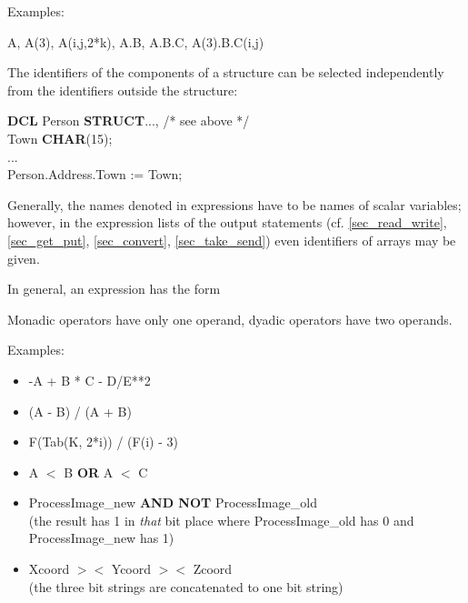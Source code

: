


Examples:

A, A(3), A(i,j,2*k), A.B, A.B.C, A(3).B.C(i,j)

The identifiers of the components of a structure can be selected
independently from the identifiers outside the structure:

{\bf DCL} Person {\bf STRUCT}..., /* see above */ \\
\x Town {\bf CHAR}(15);\\
\x ...\\
Person.Address.Town := Town;

Generally, the names denoted in expressions have to be names of scalar
variables; however, in the expression lists of the output statements
(cf. \ref{sec_read_write}, \ref{sec_get_put}, \ref{sec_convert}, 
\ref{sec_take_send}) even identifiers of arrays may be given.

In general, an expression has the form



Monadic operators have only one operand, dyadic operators have two
operands.







Examples:

\begin{itemize}
\item -A + B * C - D/E**2
\item (A - B) / (A + B)
\item F(Tab(K, 2*i)) / (F(i) - 3)
\item A $<$ B {\bf OR} A $<$ C
\item ProcessImage\_new {\bf AND NOT} ProcessImage\_old\\
      (the result has 1 in {\it that} bit place where ProcessImage\_old
      has 0 and ProcessImage\_new has 1)
\item Xcoord $><$ Ycoord $><$ Zcoord\\
      (the three bit strings are concatenated to one bit string)
\end{itemize}

